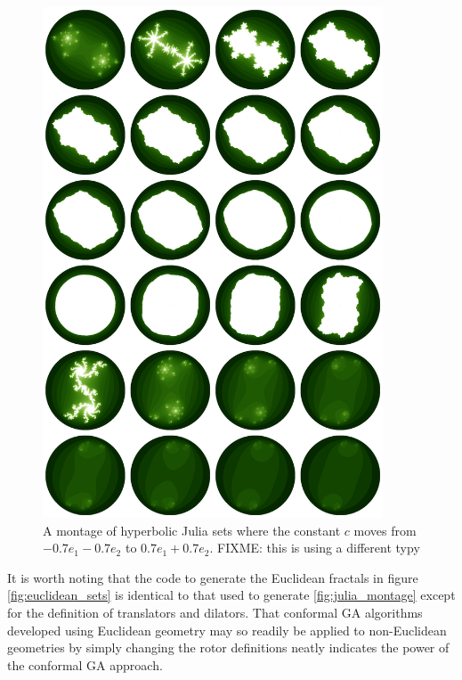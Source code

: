 \begin{figure}[p]
\centering
\includegraphics[width=0.9\textwidth]{direct_julia_noneuclid}
\caption{\label{fig:direct_julia_noneuclid} 
  A montage of hyperbolic Julia sets where the constant $c$ moves from $-0.7e_1 - 0.7e_2$
  to $0.7e_1 + 0.7e_2$. FIXME: this is using a different typy
}
\end{figure}

It is worth noting that the code to generate the Euclidean fractals in figure 
\ref{fig:euclidean_sets} is identical to that used to generate
\ref{fig:julia_montage} except for the 
definition of translators and dilators.
That conformal GA algorithms developed using Euclidean geometry may so readily
be applied to non-Euclidean geometries by simply changing the rotor definitions neatly
indicates the power of the conformal GA approach.




